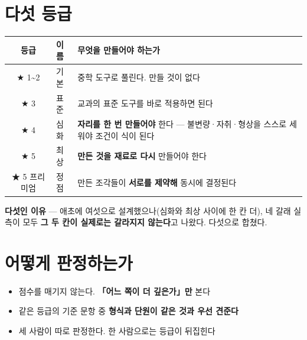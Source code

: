 \documentclass[11pt]{article}
\begin{document}
\section{다섯 등급}

\begin{center}
\begin{tabular}{@{}clp{78mm}@{}}
\toprule
\textbf{등급} & \textbf{이름} & \textbf{무엇을 만들어야 하는가} \\
\midrule
★ 1\textasciitilde2 & 기본 & 중학 도구로 풀린다. 만들 것이 없다 \\
★ 3 & 표준 & 교과의 표준 도구를 바로 적용하면 된다 \\
★ 4 & 심화 & \textbf{자리를 한 번 만들어야} 한다 — 불변량·자취·형상을 스스로 세워야 조건이 식이 된다 \\
★ 5 & 최상 & \textbf{만든 것을 재료로 다시} 만들어야 한다 \\
★ 5 프리미엄 & 정점 & 만든 조각들이 \textbf{서로를 제약해} 동시에 결정된다 \\
\bottomrule
\end{tabular}
\end{center}

\vspace{2mm}
\textbf{다섯인 이유} — 애초에 여섯으로 설계했으나(심화와 최상 사이에 한 칸 더),
네 갈래 실측이 모두 \textbf{그 두 칸이 실제로는 갈라지지 않는다}고 나왔다. 다섯으로 합쳤다.

\section{어떻게 판정하는가}

\begin{center}
\end{center}

\begin{itemize}
\item 점수를 매기지 않는다. \textbf{「어느 쪽이 더 깊은가」만} 본다
\item 같은 등급의 기준 문항 중 \textbf{형식과 단원이 같은 것과 우선 견준다}
\item 세 사람이 따로 판정한다. 한 사람으로는 등급이 뒤집힌다
\end{itemize}
\end{document}
